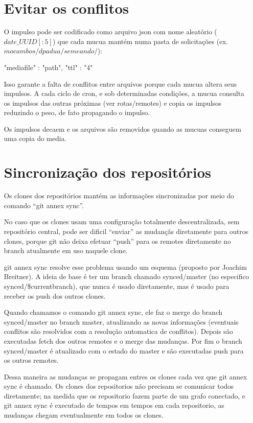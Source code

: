 \section{Evitar os conflitos}

O impulso pode ser codificado como arquivo json com nome aleatório
($date\_UUID[:5]$) que cada mucua mantém numa pasta de solicitações
(ex. $mocambos/dpadua/semeando/$):

\begin{code}
  {"mediafile" : "path", "ttl" : "4" } 
\end{code} 

Isso garante a falta de conflitos entre arquivos porque cada mucua
altera seus impulsos. A cada ciclo de cron, e sob determinadas
condições, a mucua consulta os impulsos das outras próximas (ver
rotas/remotes) e copia os impulsos reduzindo o peso, de fato
propagando o impulso.

Os impulsos decaem e os arquivos são removidos quando as mucuas
conseguem uma copia do media.  



\section{Sincronização dos repositórios}
Os clones dos repositórios mantém as informações sincronizadas por
meio do comando ``git annex sync''.

No caso que os clones usam uma configuração totalmente
descentralizada, sem repositório central, pode ser dificil ``enviar''
as mudançãs diretamente para outros clones, porque git não deixa
efetuar ``push'' para os remotes diretamente no branch atualmente em
uso naquele clone.

git annex sync resolve esse problema usando um esquema (proposto por
Joachim Breitner). A ideia de base é ter um branch chamado
synced/master (no especifico synced/\$currentbranch), que nunca é
usado diretamente, mas é usado para receber os push dos outros clones.

Quando chamamos o comando git annex sync, ele faz o merge do branch
synced/master no branch master, atualizando as novas informações
(eventuais conflitos são resolvidos com a resolução automatica de
conflitos). Depois são executadas fetch dos outros remotes e o merge
das mudanças. Por fim o branch synced/master é atualizado com o estado
do master e são executadas push para os outros remotes.

Dessa maneira as mudanças se propagam entres os clones cada vez que
git annex sync é chamado. Os clones dos repositorios não precisam se
comunicar todos diretamente; na medida que os repositorio fazem parte
de um grafo conectado, e git annex sync é executado de tempos em
tempos em cada repositorio, as mudanças chegam eventualmente em todos
os clones.


